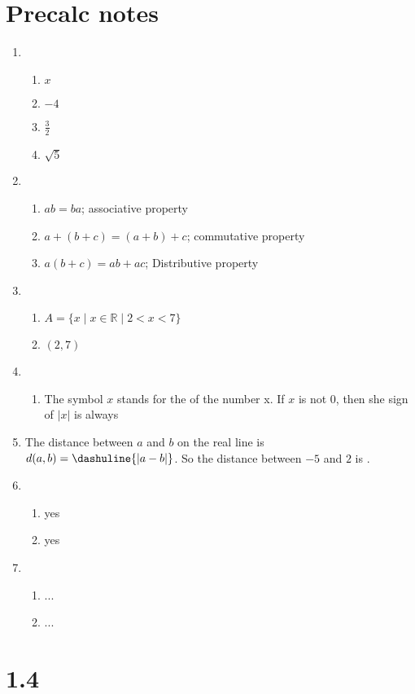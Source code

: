 \documentclass[12pt]{article}
\begin{document}
\section*{Precalc notes}

\begin{enumerate}
    \item \begin{enumerate}
              \item $x$
              \item $-4$
              \item $\frac 3 2$
              \item $\sqrt 5$
          \end{enumerate}
    \item \begin{enumerate}
              \item $ab=ba$; associative property
              \item $a + (b + c) = (a + b) + c$; commutative property
              \item $a(b + c) = ab + ac$; Distributive property
          \end{enumerate}
    \item \begin{enumerate}
              \item $A = \{x \mid x \in \mathbb{R} \mid 2 < x < 7 \}$
              \item $(2,7)$
          \end{enumerate}
    \item
          \begin{enumerate}
              \item The symbol $x$ stands for the  of the number x.
                    \newline If $x$ is not 0, then she sign of $|x|$ is always 
          \end{enumerate}
    \item The distance between $a$ and $b$ on the real line is $d(a,b) = \dashuline{|a-b|}$.
          \newline So the distance between $-5$ and $2$ is .
    \item \begin{enumerate}
              \item yes
              \item yes
          \end{enumerate}
    \item \begin{enumerate}
              \item ...
              \item ...
          \end{enumerate}

\end{enumerate}
\section*{1.4 }
\end{document}
